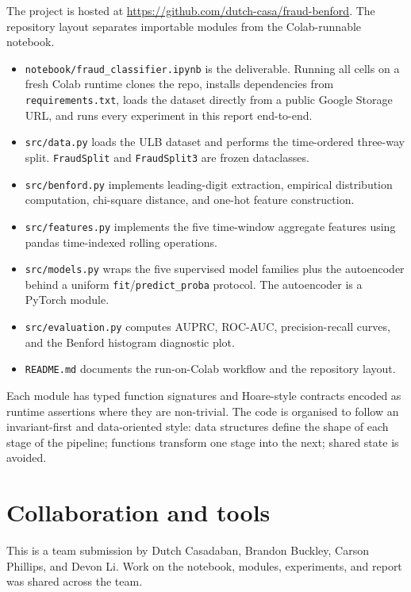 \documentclass{article}
\begin{document}
The project is hosted at \url{https://github.com/dutch-casa/fraud-benford}. The repository layout separates importable modules from the Colab-runnable notebook.

\begin{itemize}
\item \texttt{notebook/fraud\_classifier.ipynb} is the deliverable. Running all cells on a fresh Colab runtime clones the repo, installs dependencies from \texttt{requirements.txt}, loads the dataset directly from a public Google Storage URL, and runs every experiment in this report end-to-end.
\item \texttt{src/data.py} loads the ULB dataset and performs the time-ordered three-way split. \texttt{FraudSplit} and \texttt{FraudSplit3} are frozen dataclasses.
\item \texttt{src/benford.py} implements leading-digit extraction, empirical distribution computation, chi-square distance, and one-hot feature construction.
\item \texttt{src/features.py} implements the five time-window aggregate features using pandas time-indexed rolling operations.
\item \texttt{src/models.py} wraps the five supervised model families plus the autoencoder behind a uniform \texttt{fit}/\texttt{predict\_proba} protocol. The autoencoder is a PyTorch module.
\item \texttt{src/evaluation.py} computes AUPRC, ROC-AUC, precision-recall curves, and the Benford histogram diagnostic plot.
\item \texttt{README.md} documents the run-on-Colab workflow and the repository layout.
\end{itemize}

Each module has typed function signatures and Hoare-style contracts encoded as runtime assertions where they are non-trivial. The code is organised to follow an invariant-first and data-oriented style: data structures define the shape of each stage of the pipeline; functions transform one stage into the next; shared state is avoided.

\section{Collaboration and tools}

This is a team submission by Dutch Casadaban, Brandon Buckley, Carson Phillips, and Devon Li. Work on the notebook, modules, experiments, and report was shared across the team.
\end{document}
